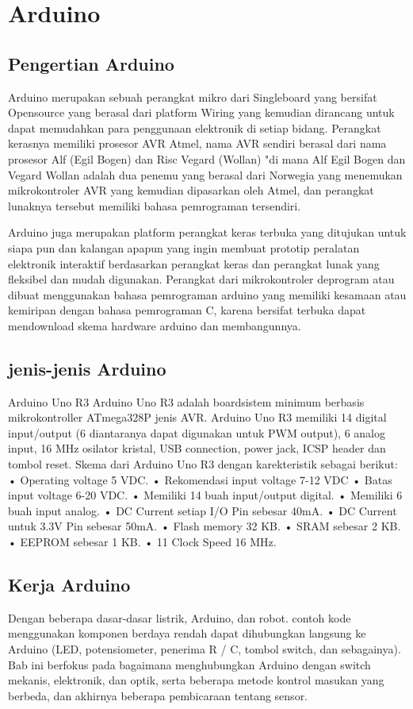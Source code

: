 \section{Arduino}
\subsection{Pengertian Arduino}
Arduino merupakan sebuah perangkat mikro dari Singleboard yang bersifat Opensource yang berasal dari platform Wiring yang kemudian dirancang untuk dapat memudahkan para penggunaan elektronik di setiap bidang. Perangkat kerasnya memiliki prosesor AVR Atmel, nama AVR sendiri berasal dari nama prosesor Alf (Egil Bogen) dan Risc Vegard (Wollan) "di mana Alf Egil Bogen dan Vegard Wollan adalah dua penemu yang berasal dari Norwegia yang menemukan mikrokontroler AVR yang kemudian dipasarkan oleh Atmel, dan perangkat lunaknya tersebut memiliki bahasa pemrograman tersendiri. 

Arduino juga merupakan platform perangkat keras terbuka yang ditujukan untuk siapa pun dan kalangan apapun yang ingin membuat prototip peralatan elektronik interaktif berdasarkan perangkat keras dan perangkat lunak yang fleksibel dan mudah digunakan. Perangkat dari mikrokontroler deprogram atau dibuat menggunakan bahasa pemrograman arduino yang memiliki kesamaan atau kemiripan dengan bahasa pemrograman C, karena bersifat terbuka dapat mendownload skema hardware arduino dan membangunnya. 

\subsection{jenis-jenis Arduino}
Arduino Uno R3
Arduino Uno R3 adalah boardsistem minimum berbasis mikrokontroller ATmega328P jenis AVR. Arduino Uno R3 memiliki 14 digital input/output (6
diantaranya dapat digunakan untuk PWM output), 6 analog input, 16 MHz osilator kristal, USB connection, power jack, ICSP header dan tombol reset. Skema dari Arduino Uno R3 dengan
karekteristik sebagai berikut:
• Operating voltage 5 VDC.
• Rekomendasi input voltage 7-12
VDC
• Batas input voltage 6-20 VDC.
• Memiliki 14 buah input/output
digital.
• Memiliki 6 buah input analog.
• DC Current setiap I/O Pin sebesar
40mA.
• DC Current untuk 3.3V Pin sebesar
50mA.
• Flash memory 32 KB.
• SRAM sebesar 2 KB.
• EEPROM sebesar 1 KB.
• 11 Clock Speed 16 MHz.

\subsection{Kerja Arduino}
Dengan beberapa dasar-dasar listrik, Arduino, dan robot.
contoh kode menggunakan komponen berdaya rendah dapat dihubungkan langsung ke Arduino (LED, potensiometer, penerima R / C, tombol switch, dan sebagainya). 
Bab ini berfokus pada bagaimana menghubungkan Arduino dengan switch mekanis, elektronik, dan optik, serta beberapa metode kontrol masukan yang berbeda, dan akhirnya beberapa pembicaraan tentang sensor.

